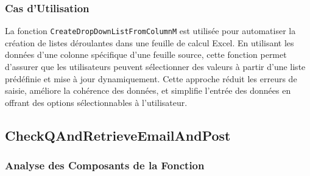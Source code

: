 \documentclass[a4paper, oneside, 12pt, final]{extreport}
\begin{document}
\subsubsection{Cas d'Utilisation}

La fonction \texttt{CreateDropDownListFromColumnM} est utilisée pour automatiser la création de listes déroulantes dans une feuille de calcul Excel. En utilisant les données d'une colonne spécifique d'une feuille source, cette fonction permet d'assurer que les utilisateurs peuvent sélectionner des valeurs à partir d'une liste prédéfinie et mise à jour dynamiquement. Cette approche réduit les erreurs de saisie, améliore la cohérence des données, et simplifie l'entrée des données en offrant des options sélectionnables à l'utilisateur.
\subsection{CheckQAndRetrieveEmailAndPost}

\subsubsection{Analyse des Composants de la Fonction}
\end{document}
